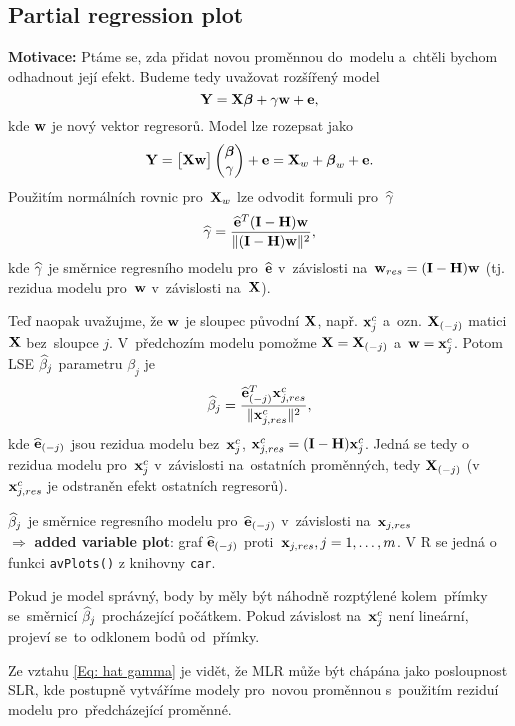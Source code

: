 \subsection{Partial regression plot}
	\textbf{Motivace:} Ptáme se, zda přidat novou proměnnou do~modelu a~chtěli bychom odhadnout její efekt. Budeme tedy uvažovat rozšířený model
	 $$
	\mathbf{Y} = \mathbf{X} \boldsymbol{\beta} + \gamma \mathbf{w} + \mathbf{e},
	 $$
	kde $\mathbf{w}$ je nový vektor regresorů. Model lze rozepsat jako
	 $$
	\mathbf{Y} = \begin{bmatrix}
	\mathbf{X} \mathbf{w}
	\end{bmatrix} \begin{pmatrix}
	\boldsymbol{\beta} \\ \gamma
	\end{pmatrix} + \mathbf{e} = \mathbf{X}_w + \boldsymbol{\beta}_w + \mathbf{e}.
	 $$
	Použitím normálních rovnic pro~$\mathbf{X}_w$ lze odvodit formuli pro~$\widehat{\gamma}$
	\begin{equation}
		\widehat{\gamma} = \frac{\widehat{\mathbf{e}}^T (\textbf{I} - \textbf{H}) \mathbf{w}}{\| (\textbf{I} - \textbf{H})\mathbf{w} \|^2},
		\label{Eq: hat gamma}
	\end{equation}
	kde $\widehat{\gamma}$ je směrnice regresního modelu pro~$\widehat{\mathbf{e}}$ v~závislosti na~$\mathbf{w}_{res} = (\textbf{I} - \textbf{H})\mathbf{w}$ (tj. rezidua modelu pro~$\mathbf{w}$ v~závislosti na~$\mathbf{X}$).
	
	Teď naopak uvažujme, že $\mathbf{w}$ je sloupec původní $\mathbf{X}$, např. $\mathbf{x}_j^c$ a~ozn. $\mathbf{X}_{(-j)}$ matici $\mathbf{X}$ bez~sloupce $j$. V~předchozím modelu pomožme $\mathbf{X} = \mathbf{X}_{(-j)}$ a~$\mathbf{w} = \mathbf{x}_j^c$. Potom  LSE $\widehat{\beta}_j$ parametru $\beta_j$ je
	 $$
	\widehat{\beta}_j = \frac{\widehat{\mathbf{e}}_{(-j)}^T \mathbf{x}_{j, res}^c}{\| \mathbf{x}_{j,res}^c \|^2},
	 $$
	kde $\widehat{\mathbf{e}}_{(-j)}$ jsou rezidua modelu bez~$\mathbf{x}_j^c$, $\mathbf{x}_{j,res}^c = (\textbf{I} - \textbf{H}) \mathbf{x}_j^c$. Jedná se tedy o rezidua modelu pro~$\mathbf{x}_j^c$ v~závislosti na~ostatních proměnných, tedy $\mathbf{X}_{(-j)}$ (v $\mathbf{x}_{j,res}^c$ je odstraněn efekt ostatních regresorů).
	
	 $\widehat{\beta}_j$ je směrnice regresního modelu pro~$\widehat{\mathbf{e}}_{(-j)}$ v~závislosti na~$\mathbf{x}_{j, res}$ \\ $\Rightarrow$ \textbf{added variable plot}: graf $\widehat{\mathbf{e}}_{(-j)}$ proti~$\mathbf{x}_{j, res}, j = 1,\dots, m$. V R se jedná o funkci \verb|avPlots()| z knihovny \verb|car|.
	
	Pokud je model správný, body by měly být náhodně rozptýlené kolem~přímky se~směrnicí $\widehat{\beta}_j$ procházející počátkem. Pokud závislost na~$\mathbf{x}_j^c$ není lineární, projeví se~to odklonem bodů od~přímky.


\begin{remark}
Ze vztahu \eqref{Eq: hat gamma} je vidět, že MLR může být chápána jako posloupnost SLR, kde postupně vytváříme modely pro~novou proměnnou s~použitím reziduí modelu pro~předcházející proměnné.
\end{remark}


